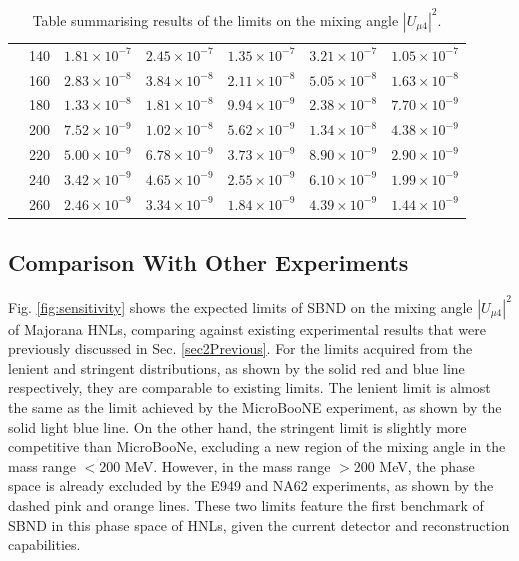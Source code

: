 \begin{table}[htbp!]
\begin{center}
\begin{tabular}{|c| c | c | c | c | c | c|}
& 140 & $1.81\times10^{-7}$ & $2.45\times10^{-7}$ & $1.35\times10^{-7}$ & $3.21\times10^{-7}$ & $1.05\times10^{-7}$ \\
& 160 & $2.83\times10^{-8}$ & $3.84\times10^{-8}$ & $2.11\times10^{-8}$ & $5.05\times10^{-8}$ & $1.63\times10^{-8}$ \\
& 180 & $1.33\times10^{-8}$ & $1.81\times10^{-8}$ & $9.94\times10^{-9}$ & $2.38\times10^{-8}$ & $7.70\times10^{-9}$ \\
& 200 & $7.52\times10^{-9}$ & $1.02\times10^{-8}$ & $5.62\times10^{-9}$ & $1.34\times10^{-8}$ & $4.38\times10^{-9}$ \\
& 220 & $5.00\times10^{-9}$ & $6.78\times10^{-9}$ & $3.73\times10^{-9}$ & $8.90\times10^{-9}$ & $2.90\times10^{-9}$ \\
& 240 & $3.42\times10^{-9}$ & $4.65\times10^{-9}$ & $2.55\times10^{-9}$ & $6.10\times10^{-9}$ & $1.99\times10^{-9}$ \\
& 260 & $2.46\times10^{-9}$ & $3.34\times10^{-9}$ & $1.84\times10^{-9}$ & $4.39\times10^{-9}$ & $1.44\times10^{-9}$ \\ [0.5ex]
\hline
\end{tabular}
\end{center}
\caption{Table summarising results of the limits on the mixing angle $|U_{\mu4}|^2$.}
\label{table:result}
\end{table}

\subsection{Comparison With Other Experiments}

Fig. \ref{fig:sensitivity} shows the expected limits of SBND on the mixing angle $|U_{\mu4}|^2$ of Majorana HNLs, comparing against existing experimental results that were previously discussed in Sec. \ref{sec2Previous}.
For the limits acquired from the lenient and stringent distributions, as shown by the solid red and blue line respectively, they are comparable to existing limits.
The lenient limit is almost the same as the limit achieved by the MicroBooNE experiment, as shown by the solid light blue line.
On the other hand, the stringent limit is slightly more competitive than MicroBooNe, excluding a new region of the mixing angle in the mass range $< 200$ MeV.
However, in the mass range $> 200$ MeV, the phase space is already excluded by the E949 and NA62 experiments, as shown by the dashed pink and orange lines.
These two limits feature the first benchmark of SBND in this phase space of HNLs, given the current detector and reconstruction capabilities.


